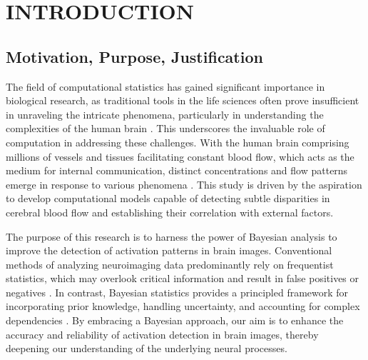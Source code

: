

\chapter{INTRODUCTION}  
\section{Motivation, Purpose, Justification}

The field of computational statistics has gained significant importance in biological research, as traditional tools in the life sciences often prove insufficient in unraveling the intricate phenomena, particularly in understanding the complexities of the human brain \cite{de2013evolution}. This underscores the invaluable role of computation in addressing these challenges. With the human brain comprising millions of vessels and tissues facilitating constant blood flow, which acts as the medium for internal communication, distinct concentrations and flow patterns emerge in response to various phenomena \cite{willie2014integrative}. This study is driven by the aspiration to develop computational models capable of detecting subtle disparities in cerebral blood flow and establishing their correlation with external factors.

The purpose of this research is to harness the power of Bayesian analysis to improve the detection of activation patterns in brain images. Conventional methods of analyzing neuroimaging data predominantly rely on frequentist statistics, which may overlook critical information and result in false positives or negatives \cite{friston1996detecting}. In contrast, Bayesian statistics provides a principled framework for incorporating prior knowledge, handling uncertainty, and accounting for complex dependencies \cite{penny2011statistical}. By embracing a Bayesian approach, our aim is to enhance the accuracy and reliability of activation detection in brain images, thereby deepening our understanding of the underlying neural processes.

